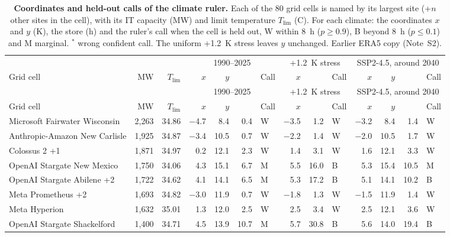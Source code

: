 {\scriptsize\setlength{\tabcolsep}{3pt}
\begin{longtable}{@{}lrrrrrlrrlrrrl@{}}
\caption{\textbf{Coordinates and held-out calls of the climate ruler.} Each of the 80 grid cells is named by its largest site (+$n$ other sites in the cell), with its IT capacity (MW) and limit temperature $T_{\lim}$ (\textdegree{}C). For each climate: the coordinates $x$ and $y$ (K), the store \hstar{} (h) and the ruler's call when the cell is held out, W within 8~h ($p \ge 0.9$), B beyond 8~h ($p \le 0.1$) and M marginal. $^{\ast}$ wrong confident call. The uniform +1.2~K stress leaves $y$ unchanged. Earlier ERA5 copy (Note~S2).}\label{tab:s17}\\
\toprule
& & & \multicolumn{4}{c}{1990--2025} & \multicolumn{3}{c}{+1.2~K stress} & \multicolumn{4}{c}{SSP2-4.5, around 2040}\\
\cmidrule(lr){4-7}\cmidrule(lr){8-10}\cmidrule(l){11-14}
Grid cell & MW & $T_{\lim}$ & $x$ & $y$ & \hstar{} & Call & $x$ & \hstar{} & Call & $x$ & $y$ & \hstar{} & Call\\
\midrule
\endfirsthead
\toprule
& & & \multicolumn{4}{c}{1990--2025} & \multicolumn{3}{c}{+1.2~K stress} & \multicolumn{4}{c}{SSP2-4.5, around 2040}\\
\cmidrule(lr){4-7}\cmidrule(lr){8-10}\cmidrule(l){11-14}
Grid cell & MW & $T_{\lim}$ & $x$ & $y$ & \hstar{} & Call & $x$ & \hstar{} & Call & $x$ & $y$ & \hstar{} & Call\\
\midrule
\endhead
\bottomrule
\endfoot
Microsoft Fairwater Wisconsin & 2,263 & 34.86 & $-$4.7 & 8.4 & 0.4 & W & $-$3.5 & 1.2 & W & $-$3.2 & 8.4 & 1.4 & W \\
Anthropic-Amazon New Carlisle & 1,925 & 34.87 & $-$3.4 & 10.5 & 0.7 & W & $-$2.2 & 1.4 & W & $-$2.0 & 10.5 & 1.7 & W \\
Colossus 2 +1 & 1,871 & 34.97 & 0.2 & 12.1 & 2.3 & W & 1.4 & 3.1 & W & 1.6 & 12.1 & 3.3 & W \\
OpenAI Stargate New Mexico & 1,750 & 34.06 & 4.3 & 15.1 & 6.7 & M & 5.5 & 16.0 & B & 5.3 & 15.4 & 10.5 & M \\
OpenAI Stargate Abilene +2 & 1,722 & 34.62 & 4.1 & 14.1 & 6.5 & M & 5.3 & 17.2 & B & 5.1 & 14.1 & 10.2 & B \\
Meta Prometheus +2 & 1,693 & 34.82 & $-$3.0 & 11.9 & 0.7 & W & $-$1.8 & 1.3 & W & $-$1.5 & 11.9 & 1.4 & W \\
Meta Hyperion & 1,632 & 35.01 & 1.3 & 12.0 & 2.5 & W & 2.5 & 3.4 & W & 2.5 & 12.1 & 3.6 & W \\
OpenAI Stargate Shackelford & 1,400 & 34.71 & 4.5 & 13.9 & 10.7 & M & 5.7 & 30.8 & B & 5.6 & 14.0 & 19.4 & B \\

\end{longtable}}
